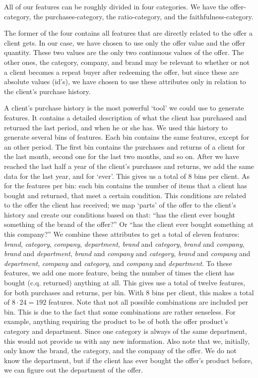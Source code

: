 \documentclass[a4paper]{article}
\begin{document}
All of our features can be roughly divided in four categories. We have the offer-category, the purchases-category, the ratio-category, and the faithfulness-category.

The former of the four contains all features that are directly related to the offer a client gets. In our case, we have chosen to use only the offer value and the offer quantity. These two values are the only two continuous values of the offer. The other ones, the category, company, and brand may be relevant to whether or not a client becomes a repeat buyer after redeeming the offer, but since these are absolute values (id's), we have chosen to use these attributes only in relation to the client's purchase history.

A client's purchase history is the most powerful `tool' we could use to generate features. It contains a detailed description of what the client has purchased and returned the last period, and when he or she has. We used this history to generate several bins of features. Each bin contains the same features, except for an other period. The first bin contains the purchases and returns of a client for the last month, second one for the last two months, and so on. After we have reached the last half a year of the client's purchases and returns, we add the same data for the last year, and for `ever'. This gives us a total of 8 bins per client. As for the features per bin: each bin contains the number of items that a client has bought and returned, that meet a certain condition. This conditions are related to the offer the client has received; we map `parts' of the offer to the client's history and create our conditions based on that: ``has the client ever bought something of the brand of the offer?'' Or ``has the client ever bought something at this company?'' We combine these attributes to get a total of eleven features: \emph{brand}, \emph{category}, \emph{company}, \emph{department}, \emph{brand} and \emph{category}, \emph{brand} and \emph{company}, \emph{brand} and \emph{department}, \emph{brand} and \emph{company} and \emph{category}, \emph{brand} and \emph{company} and \emph{department}, \emph{company} and \emph{category}, and \emph{company} and \emph{department}. To these features, we add one more feature, being the number of times the client has bought (c.q. returned) anything at all. This gives use a total of twelve features, for both purchases and returns, per bin. With 8 bins per client, this makes a total of $8\cdot24=192$ features. Note that not all possible combinations are included per bin. This is due to the fact that some combinations are rather senseless. For example, anything requiring the product to be of both the offer product's category and department. Since one category is always of the same department, this would not provide us with any new information. Also note that we, initially, only know the brand, the category, and the company of the offer. We do not know the department, but if the client has ever bought the offer's product before, we can figure out the department of the offer.
\end{document}
